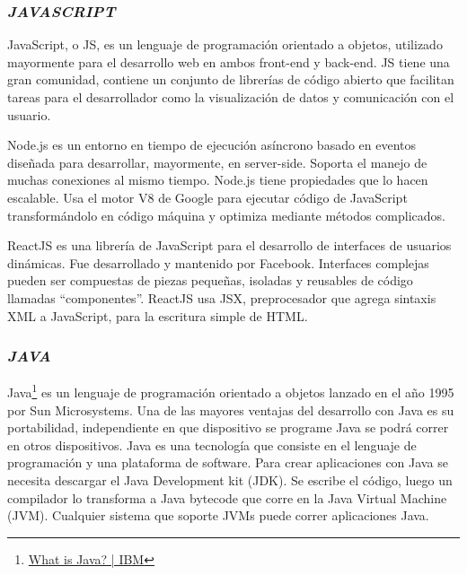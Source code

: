 \subsubsection{\textit{JAVASCRIPT}}

JavaScript, o JS, es un lenguaje de programación orientado a objetos, utilizado mayormente para el desarrollo web en ambos front-end y back-end. JS tiene una gran comunidad, contiene un conjunto de librerías de código abierto que facilitan tareas para el desarrollador como la visualización de datos y comunicación con el usuario.


Node.js es un entorno en tiempo de ejecución asíncrono basado en eventos diseñada para desarrollar, mayormente, en server-side. Soporta el manejo de muchas conexiones al mismo tiempo. Node.js tiene propiedades que lo hacen escalable. Usa el motor V8 de Google para ejecutar código de JavaScript transformándolo en código máquina y optimiza mediante métodos complicados. \cite{webframedbws}


ReactJS es una librería de JavaScript para el desarrollo de interfaces de usuarios dinámicas. Fue desarrollado y mantenido por Facebook. Interfaces complejas pueden ser compuestas de piezas pequeñas, isoladas y reusables de código llamadas “componentes”. ReactJS usa JSX, preprocesador que agrega sintaxis XML a JavaScript, para la escritura simple de HTML. \cite{webframedbws}

\subsubsection{\textit{JAVA}}

Java\footnote{\href{https://www.ibm.com/cloud/learn/java-explained}{What is Java? | IBM}} es un lenguaje de programación orientado a objetos lanzado en el año 1995 por Sun Microsystems. Una de las mayores ventajas del desarrollo con Java es su portabilidad, independiente en que dispositivo se programe Java se podrá correr en otros dispositivos.
Java es una tecnología que consiste en el lenguaje de programación y una plataforma de software. Para crear aplicaciones con Java se necesita descargar el Java Development kit (JDK). Se escribe el código, luego un compilador lo transforma a Java bytecode que corre en la Java Virtual Machine (JVM). Cualquier sistema que soporte JVMs puede correr aplicaciones Java.


